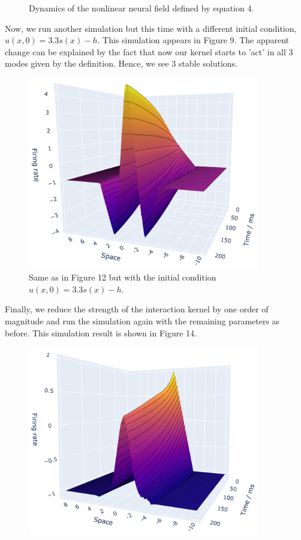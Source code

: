 \documentclass[12pt]{article}
\begin{document}
\begin{enumerate}
\begin{figure}[H]
    \caption{Dynamics of the nonlinear neural field defined by equation 4.}
\end{figure}
Now, we run another simulation but this time with a different initial condition, $u(x, 0)=3.3s(x)-h$. This simulation appears in Figure 9.
The apparent change can be explained by the fact that now our kernel starts to 'act' in all 3 modes given by the definition. Hence, we see 3 stable solutions.
\begin{figure}[H]
    \centering
    \includegraphics[width=0.9\textwidth]{./figure13.png}
    \caption{Same as in Figure 12 but with the initial condition $u(x, 0)=3.3s(x)-h$.}
\end{figure}
Finally, we reduce the strength of the interaction kernel by one order of magnitude and run the simulation again with the remaining parameters as before.
This simulation result is shown in Figure 14.
\begin{figure}[H]
    \centering
    \includegraphics[width=0.9\textwidth]{./figure14.png}

\end{figure}
\end{enumerate}
\end{document}
